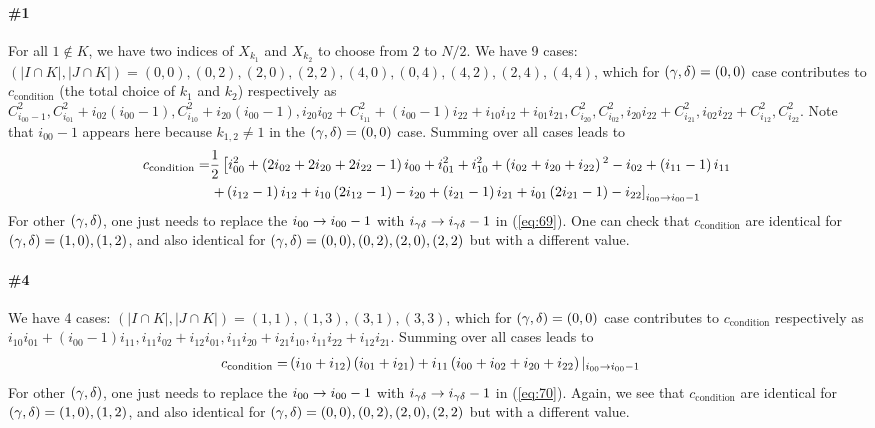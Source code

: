 \documentclass[11pt]{article}
\renewcommand{\>}{\rangle}
\newcommand{\<}{\langle}
\begin{document}
\paragraph{\#1} For all $1\notin K$, we have two indices of $X_{k_{1}}$
and $X_{k_{2}}$ to choose from $2$ to $N/2$. We have 9 cases: $(|I\cap K|,|J\cap K|)=(0,0),(0,2),(2,0),(2,2),(4,0),(0,4),(4,2),(2,4),(4,4)$,
which for $(\gamma,\delta)=(0,0)$ case contributes to $c_{\text{condition}}$
(the total choice of $k_{1}$ and $k_{2}$) respectively as $C_{i_{00}-1}^{2},C_{i_{01}}^{2}+i_{02}(i_{00}-1),C_{i_{10}}^{2}+i_{20}(i_{00}-1),i_{20}i_{02}+C_{i_{11}}^{2}+(i_{00}-1)i_{22}+i_{10}i_{12}+i_{01}i_{21},C_{i_{20}}^{2},C_{i_{02}}^{2},i_{20}i_{22}+C_{i_{21}}^{2},i_{02}i_{22}+C_{i_{12}}^{2},C_{i_{22}}^{2}$.
Note that $i_{00}-1$ appears here because $k_{1,2}\neq1$ in the
$(\gamma,\delta)=(0,0)$ case. Summing over all cases leads to
\begin{align}
c_{\text{condition}}= & \frac{1}{2}\left[i_{00}^{2}+\left(2i_{02}+2i_{20}+2i_{22}-1\right)i_{00}+i_{01}^{2}+i_{10}^{2}+\left(i_{02}+i_{20}+i_{22}\right){}^{2}-i_{02}+\left(i_{11}-1\right)i_{11}\right.\nonumber \\
 & \left.+\left(i_{12}-1\right)i_{12}+i_{10}\left(2i_{12}-1\right)-i_{20}+\left(i_{21}-1\right)i_{21}+i_{01}\left(2i_{21}-1\right)-i_{22}\right]_{i_{00}\rightarrow i_{00}-1}\label{eq:69}
\end{align}
For other $(\gamma,\delta)$, one just needs to replace the $i_{00}\rightarrow i_{00}-1$
with $i_{\gamma\delta}\rightarrow i_{\gamma\delta}-1$ in (\ref{eq:69}). One can check that
$c_{\text{condition}}$ are identical for $(\gamma,\delta)=(1,0),(1,2)$,
and also identical for $(\gamma,\delta)=(0,0),(0,2),(2,0),(2,2)$ but with
a different value.
\paragraph{\#4} We have 4 cases: $(|I\cap K|,|J\cap K|)=(1,1),(1,3),(3,1),(3,3)$,
which for $(\gamma,\delta)=(0,0)$ case contributes to $c_{\text{condition}}$
respectively as $i_{10}i_{01}+(i_{00}-1)i_{11},i_{11}i_{02}+i_{12}i_{01},i_{11}i_{20}+i_{21}i_{10},i_{11}i_{22}+i_{12}i_{21}$.
Summing over all cases leads to
\begin{align}
c_{\text{condition}}= & \left(i_{10}+i_{12}\right)\left(i_{01}+i_{21}\right)+i_{11}\left(i_{00}+i_{02}+i_{20}+i_{22}\right)|_{i_{00}\rightarrow i_{00}-1}\label{eq:70}
\end{align}
For other $(\gamma,\delta)$, one just needs to replace the $i_{00}\rightarrow i_{00}-1$
with $i_{\gamma\delta}\rightarrow i_{\gamma\delta}-1$ in (\ref{eq:70}). Again, we see that
$c_{\text{condition}}$ are identical for $(\gamma,\delta)=(1,0),(1,2)$,
and also identical for $(\gamma,\delta)=(0,0),(0,2),(2,0),(2,2)$ but with
a different value.
\end{document}
